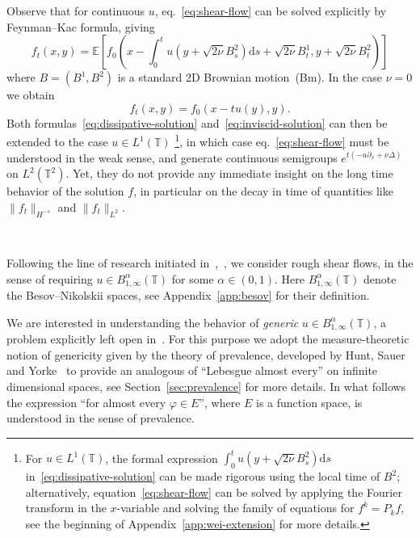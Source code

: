 \documentclass[11pt,oneside,reqno]{amsart}
\newcommand{\mathd}{\mathrm{d}}
\newcommand{\tmtextit}[1]{{{\itshape{#1}}}}
\numberwithin{equation}{section}
\begin{document}
Observe that for continuous $u$, eq.~\eqref{eq:shear-flow} can be solved
explicitly by Feynman--Kac formula, giving
\begin{equation}
  f_t (x, y) =\mathbb{E} \left[ f_0 \left( x - \int_0^t u \left( y + \sqrt{2
  \nu} B^2_s \right) \mathd s + \sqrt{2 \nu} B^1_t, y + \sqrt{2 \nu} B^2_t
  \right) \right] \label{eq:dissipative-solution}
\end{equation}
where $B = (B^1, B^2)$ is a standard 2D Brownian motion~(Bm). In the case $\nu
= 0$ we obtain
\begin{equation}
  f_t (x, y) = f_0 (x - t u (y), y) . \label{eq:inviscid-solution}
\end{equation}
Both formulas~\eqref{eq:dissipative-solution} and~\eqref{eq:inviscid-solution}
can then be extended to the case $u \in L^1 (\mathbb{T})$ \footnote{For $u
\in L^1 (\mathbb{T})$, the formal expression $\int_0^t u \left( y + \sqrt{2
\nu} B^2_s \right) \mathd s$ in~\eqref{eq:dissipative-solution} can be made
rigorous using the local time of $B^2$; alternatively,
equation~\eqref{eq:shear-flow} can be solved by applying the Fourier transform
in the $x$-variable and solving the family of equations for $f^k = P_k f$, see
the beginning of Appendix~\ref{app:wei-extension} for more details.}, in which
case eq.~\eqref{eq:shear-flow} must be understood in the weak sense, and
generate continuous semigroups $e^{t (- u \partial_x + \nu \Delta)}$ on $L^2
(\mathbb{T}^2)$. Yet, they do not provide any immediate insight on the long
time behavior of the solution $f$, in particular on the decay in time of
quantities like $\| f_t \|_{H^{- s}}$ and $\| f_t \|_{L^2}$.

\

Following the line of research initiated
in~{\cite{wei}},~{\cite{colombozelati}}, we consider rough shear flows, in the
sense of requiring $u \in B^{\alpha}_{1, \infty} (\mathbb{T})$ for some
$\alpha \in (0, 1)$. Here $B^{\alpha}_{1, \infty} (\mathbb{T})$ denote the
Besov--Nikolskii spaces, see Appendix~\ref{app:besov} for their definition.

We are interested in understanding the behavior of \tmtextit{generic} $u \in
B^{\alpha}_{1, \infty} (\mathbb{T})$, a problem explicitly left open
in~{\cite{colombozelati}}. For this purpose we adopt the measure-theoretic
notion of genericity given by the theory of prevalence, developed by Hunt,
Sauer and Yorke~{\cite{huntsauer}} to provide an analogous of ``Lebesgue
almost every'' on infinite dimensional spaces, see
Section~\ref{sec:prevalence} for more details. In what follows the expression
``for almost every $\varphi \in E$'', where $E$ is a function space, is
understood in the sense of prevalence.
\end{document}

